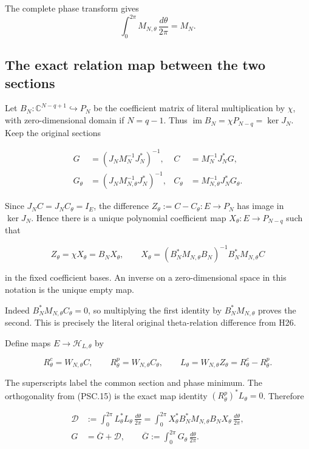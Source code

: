 The complete phase transform gives
\[
 \int_0^{2\pi}M_{N,\theta}\,\frac{d\theta}{2\pi}=M_N.
 \tag{PSC.14}
\]

\subsection{The exact relation map between the two sections}

Let \(B_N:\mathbb C^{N-q+1}\hookrightarrow P_N\) be the coefficient matrix of literal multiplication by \(\chi\), with zero-dimensional domain if \(N=q-1\). Thus
\(\operatorname{im}B_N=\chi P_{N-q}=\ker J_N\).
Keep the original sections

\[
 \begin{aligned}
 G&=(J_NM_N^{-1}J_N^*)^{-1},
 &C&=M_N^{-1}J_N^*G,\\
 G_\theta&=(J_NM_{N,\theta}^{-1}J_N^*)^{-1},
 &C_\theta&=M_{N,\theta}^{-1}J_N^*G_\theta .
 \end{aligned}
 \tag{PSC.15}
\]

Since \(J_NC=J_NC_\theta=I_E\), the difference
\(Z_\theta:=C-C_\theta:E\to P_N\) has image in \(\ker J_N\). Hence there is a unique polynomial coefficient map
\(X_\theta:E\to P_{N-q}\) such that

\[
 Z_\theta=\chi X_\theta=B_NX_\theta,\qquad
 X_\theta=(B_N^*M_{N,\theta}B_N)^{-1}
 B_N^*M_{N,\theta}C
 \tag{PSC.16}
\]

in the fixed coefficient bases. An inverse on a zero-dimensional space in this notation is the unique empty map.

Indeed \(B_N^*M_{N,\theta}C_\theta=0\), so multiplying the first identity by \(B_N^*M_{N,\theta}\) proves the second. This is precisely the literal original theta-relation difference from H26.

Define maps \(E\to\mathcal H_{L,\theta}\) by

\[
 R^c_\theta=W_{N,\theta}C,\qquad
 R^p_\theta=W_{N,\theta}C_\theta,\qquad
 L_\theta=W_{N,\theta}Z_\theta
 =R^c_\theta-R^p_\theta .
 \tag{PSC.17}
\]

The superscripts label the common section and phase minimum. The orthogonality from (PSC.15) is the exact map identity
\((R^p_\theta)^*L_\theta=0\). Therefore

\[
 \begin{aligned}
 \mathscr D
 &:=\int_0^{2\pi}L_\theta^*L_\theta\,\frac{d\theta}{2\pi}
   =\int_0^{2\pi}X_\theta^*B_N^*M_{N,\theta}B_NX_\theta
       \,\frac{d\theta}{2\pi},\\
 G&=\overline G+\mathscr D,\qquad
 \overline G:=\int_0^{2\pi}G_\theta\,\frac{d\theta}{2\pi}.
 \end{aligned}
 \tag{PSC.18}
\]

